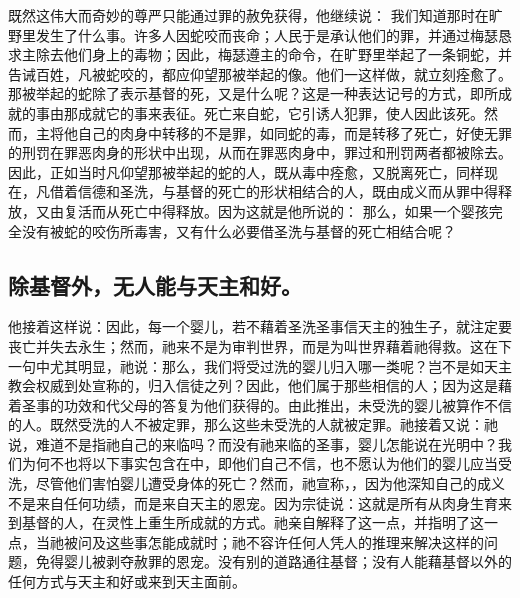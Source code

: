 既然这伟大而奇妙的尊严只能通过罪的赦免获得，他继续说： 我们知道那时在旷野里发生了什么事。许多人因蛇咬而丧命；人民于是承认他们的罪，并通过梅瑟恳求主除去他们身上的毒物；因此，梅瑟遵主的命令，在旷野里举起了一条铜蛇，并告诫百姓，凡被蛇咬的，都应仰望那被举起的像。他们一这样做，就立刻痊愈了。 那被举起的蛇除了表示基督的死，又是什么呢？这是一种表达记号的方式，即所成就的事由那成就它的事来表征。死亡来自蛇，它引诱人犯罪，使人因此该死。然而，主将他自己的肉身中转移的不是罪，如同蛇的毒，而是转移了死亡，好使无罪的刑罚在罪恶肉身的形状中出现，从而在罪恶肉身中，罪过和刑罚两者都被除去。因此，正如当时凡仰望那被举起的蛇的人，既从毒中痊愈，又脱离死亡，同样现在，凡借着信德和圣洗，与基督的死亡的形状相结合的人，既由成义而从罪中得释放，又由复活而从死亡中得释放。因为这就是他所说的： 那么，如果一个婴孩完全没有被蛇的咬伤所毒害，又有什么必要借圣洗与基督的死亡相结合呢？\par


\subsection{除基督外，无人能与天主和好。}

他接着这样说：因此，每一个婴儿，若不藉着圣洗圣事信天主的独生子，就注定要丧亡并失去永生；然而，祂来不是为审判世界，而是为叫世界藉着祂得救。这在下一句中尤其明显，祂说：那么，我们将受过洗的婴儿归入哪一类呢？岂不是如天主教会权威到处宣称的，归入信徒之列？因此，他们属于那些相信的人；因为这是藉着圣事的功效和代父母的答复为他们获得的。由此推出，未受洗的婴儿被算作不信的人。既然受洗的人不被定罪，那么这些未受洗的人就被定罪。祂接着又说：祂说，难道不是指祂自己的来临吗？而没有祂来临的圣事，婴儿怎能说在光明中？我们为何不也将以下事实包含在中，即他们自己不信，也不愿认为他们的婴儿应当受洗，尽管他们害怕婴儿遭受身体的死亡？然而，祂宣称，，因为他深知自己的成义不是来自任何功绩，而是来自天主的恩宠。因为宗徒说：这就是所有从肉身生育来到基督的人，在灵性上重生所成就的方式。祂亲自解释了这一点，并指明了这一点，当祂被问及这些事怎能成就时；祂不容许任何人凭人的推理来解决这样的问题，免得婴儿被剥夺赦罪的恩宠。没有别的道路通往基督；没有人能藉基督以外的任何方式与天主和好或来到天主面前。\par

